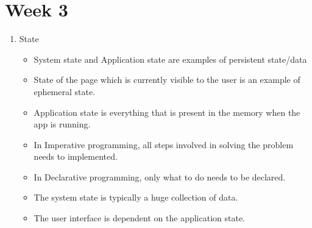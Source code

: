 \documentclass[a4paper]{article}
\begin{document}
\section{Week 3}
\begin{enumerate}
    \item State
    \begin{itemize}
        \item System state and Application state are examples of persistent state/data
        \item State of the page which is currently visible to the user is an example of ephemeral state.
        \item Application state is everything that is present in  the memory when the app is running.
        \item In Imperative programming, all steps involved in solving the problem needs to implemented.
        \item In Declarative programming, only what to do needs to be declared.
        \item The system state is typically a huge collection of data.
        \item The user interface is dependent on the application state.
    \end{itemize}
\end{enumerate}
\end{document}
